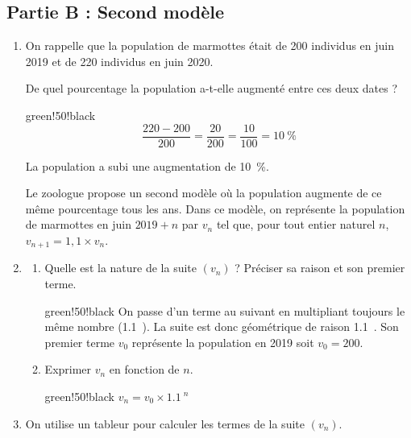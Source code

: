 \documentclass[10pt]{article}
\providecommand{\np}[2][]{{#2~#1}}
\begin{document}
	\subsection*{Partie B : Second modèle}
	
	\begin{enumerate}
		\item On rappelle que la population de marmottes était de 200 individus en juin 2019 et de 220 individus en juin 2020.
		
		De quel pourcentage la population a-t-elle augmenté entre ces deux dates ?
		
		\begin{color}{green!50!black}
		\[
		\dfrac{220 - 200}{200} = \dfrac{20}{200} = \dfrac{10}{100} = 10~\%
		\]
		
		La population a subi une augmentation de 10~\%.
		\end{color}
		
		\medskip
		
		Le zoologue propose un second modèle où la population augmente de ce même pourcentage tous les ans. Dans ce modèle, on représente la population de marmottes en juin $2019+n$ par $v_{n}$ tel que, pour tout entier naturel $n$,\quad $v_{n+1}=1,1\times v_{n}$.
		
		\item \begin{enumerate}
			\item Quelle est la nature de la suite $\left(v_{n}\right)$ ? Préciser sa raison et son premier terme.
			
			\begin{color}{green!50!black}
			On passe d'un terme au suivant en multipliant toujours le même nombre (\np{1.1}). La suite est donc géométrique de raison \np{1.1}. Son premier terme $v_{0}$ représente la population en 2019 soit $v_{0}=200$.
			\end{color}
			
			\item Exprimer $v_{n}$ en fonction de $n$.
			
			\begin{color}{green!50!black}
			$v_{n}=v_{0} \times \np{1.1}^{n}$
			\end{color}
			
		\end{enumerate}
		
		\item On utilise un tableur pour calculer les termes de la suite $\left(v_{n}\right)$.
		

\end{enumerate}
\end{document}
